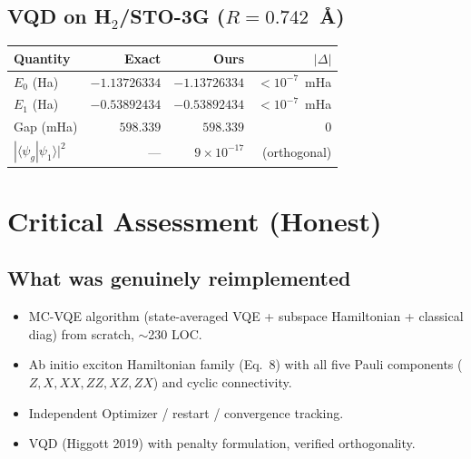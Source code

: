 \documentclass[11pt]{article}
\begin{document}
\subsection{VQD on H$_2$/STO-3G ($R=0.742$~\AA)}
\begin{center}
\begin{tabular}{lrrr}
\toprule
Quantity & Exact & Ours & $|\Delta|$ \\
\midrule
$E_0$ (Ha)          & $-1.13726334$ & $-1.13726334$ & $<10^{-7}$~mHa \\
$E_1$ (Ha)          & $-0.53892434$ & $-0.53892434$ & $<10^{-7}$~mHa \\
Gap (mHa)           & $598.339$     & $598.339$     & $0$ \\
$|\langle\psi_g|\psi_1\rangle|^2$ & --- & $9\times 10^{-17}$ & (orthogonal) \\
\bottomrule
\end{tabular}
\end{center}

\section{Critical Assessment (Honest)}
\subsection{What was genuinely reimplemented}
\begin{itemize}
\item MC-VQE algorithm (state-averaged VQE + subspace Hamiltonian + classical
      diag) from scratch, $\sim$230 LOC.
\item Ab initio exciton Hamiltonian family (Eq.~8) with all five Pauli
      components ($Z, X, XX, ZZ, XZ, ZX$) and cyclic connectivity.
\item Independent Optimizer / restart / convergence tracking.
\item VQD (Higgott 2019) with penalty formulation, verified orthogonality.
\end{itemize}
\end{document}
